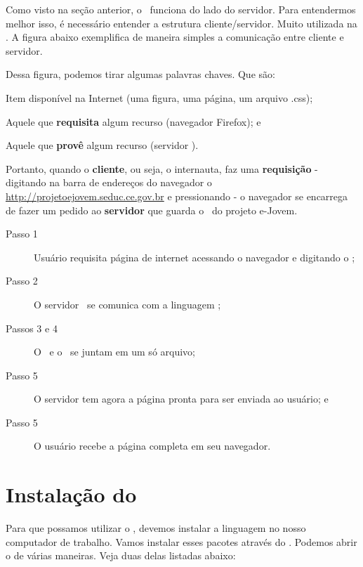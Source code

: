 Como visto na seção anterior, o \php~funciona do lado do servidor. Para entendermos
melhor isso, é necessário entender a estrutura cliente/servidor. Muito utilizada
na \internet. A figura abaixo exemplifica de maneira simples a comunicação entre
cliente e servidor.


Dessa figura, podemos tirar algumas palavras chaves. Que são:
\begin{description}[noitemsep]
  \item [Recurso] Item disponível na Internet (uma figura, uma página, um arquivo .css);
  \item [Cliente] Aquele que \textbf{requisita} algum recurso (navegador Firefox); e
  \item [Servidor] Aquele que \textbf{provê} algum recurso (servidor \apache).
\end{description}

Portanto, quando o \textbf{cliente}, ou seja, o internauta, faz uma \textbf{requisição} 
- digitando na barra de endereços do navegador o \site~
\url{http://projetoejovem.seduc.ce.gov.br} e pressionando  - o navegador 
se encarrega de fazer um pedido ao \textbf{servidor} que guarda o \site~do projeto e-Jovem.

\begin{description}
  \item [Passo 1] Usuário requisita página de internet acessando o navegador e digitando
  o \site;
  \item [Passo 2] O servidor \web~se comunica com a linguagem \php;
  \item [Passos 3 e 4] O \php~e o \html~se juntam em um só arquivo;
  \item [Passo 5] O servidor tem agora a página pronta para ser enviada ao usuário; e
  \item [Passo 5] O usuário recebe a página completa em seu navegador.
\end{description}

\section{Instalação do \php}
\label{instalacao-do-php}

Para que possamos utilizar o \php, devemos instalar a linguagem no nosso computador
de trabalho. Vamos instalar esses pacotes através do \terminal. Podemos abrir o
\terminal de várias maneiras. Veja duas delas listadas abaixo:

